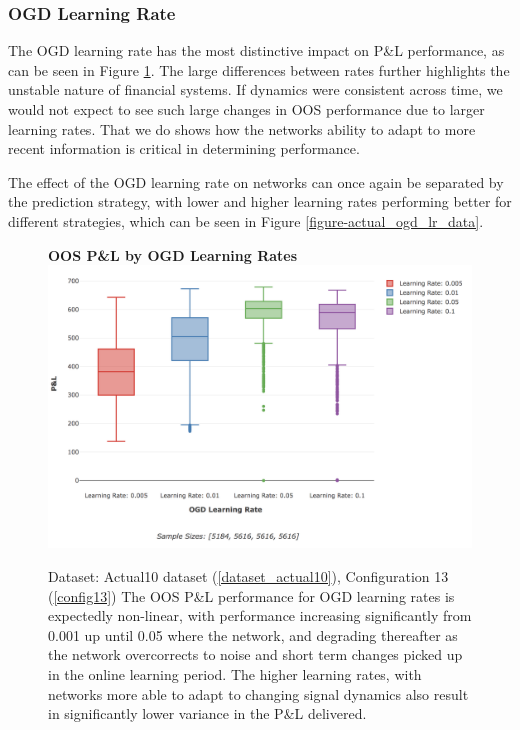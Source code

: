 \documentclass[a4paper,11pt,oneside]{article}
\theoremstyle{plain}
\theoremstyle{definition}
\begin{document}
	\subsubsection{OGD Learning Rate}
	
	The OGD learning rate has the most distinctive impact on P\&L performance, as can be seen in Figure \ref{figure-actual_ogd_lr}. The large differences between rates further highlights the unstable nature of financial systems. If dynamics were consistent across time, we would not expect to see such large changes in OOS performance due to larger learning rates. That we do shows how the networks ability to adapt to more recent information is critical in determining performance. \newline
	
	The effect of the OGD learning rate on networks can once again be separated by the prediction strategy, with lower and higher learning rates performing better for different strategies, which can be seen in Figure \ref{figure-actual_ogd_lr_data}.\newline
	
	\begin{figure}[H]
		\textbf{OOS P\&L by OGD Learning Rates}
		\centering
		\includegraphics[scale=0.45]{images/results/network/lr/actual_ogd_lr.png}
		\caption[OOS P\&L by OGD Learning Rates]
		{Dataset: Actual10 dataset (\ref{dataset_actual10}), Configuration 13 (\ref{config13})
			\newline The OOS P\&L performance for OGD learning rates is expectedly non-linear, with performance increasing significantly from 0.001 up until 0.05 where the network, and degrading thereafter as the network overcorrects to noise and short term changes picked up in the online learning period. The higher learning rates, with networks more able to adapt to changing signal dynamics also result in significantly lower variance in the P\&L delivered. }
		\label{figure-actual_ogd_lr}
	\end{figure}
\end{document}
